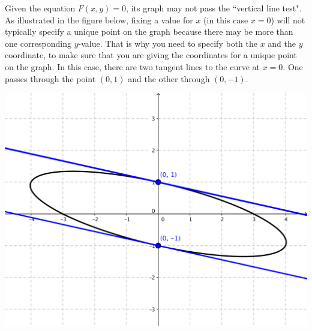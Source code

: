 \documentclass[nooutcomes,handout]{ximera}
\begin{document}
\begin{problem}
	\begin{freeResponse}
		Given the equation $F(x,y)=0$, its graph may not pass the ``vertical line test".  As illustrated in the figure below, fixing a value for $x$ (in this case $x=0$) will not typically specify a unique point on the graph because there may be more than one corresponding $y$-value.  That is why you need to specify both the $x$ and the $y$ coordinate, to make sure that you are giving the coordinates for a unique point on the graph.  In this case, there are two tangent lines to the curve at $x=0$.  One passes through the point $(0,1)$ and the other through $(0,-1)$.
	\begin{image}
\includegraphics[scale=.5]{figure2.png}
\end{image}		


	\end{freeResponse}	
\end{problem}
\end{document}
